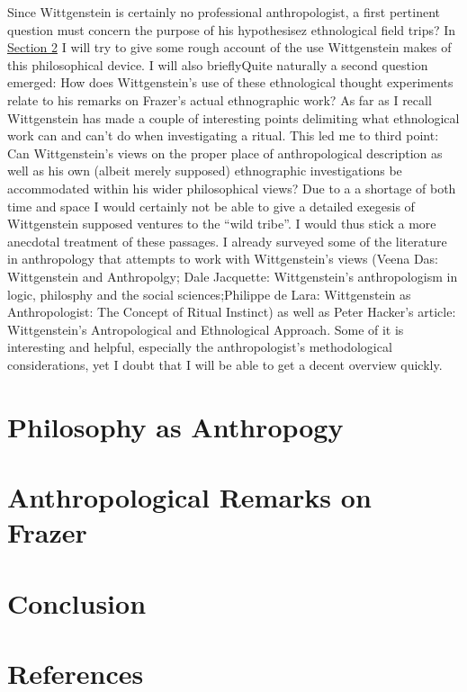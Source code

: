 \documentclass{article}
\begin{document}
Since Wittgenstein is certainly no professional anthropologist, a first pertinent question must concern the purpose of his hypothesisez ethnological field trips? In \hyperlink{sec2}{Section 2} I will try to give some rough account of the use Wittgenstein makes of this philosophical device. I will also brieflyQuite naturally a second question emerged: How does Wittgenstein’s use of these ethnological thought experiments relate to his remarks on Frazer’s actual ethnographic work? As far as I recall Wittgenstein has made a couple of interesting points delimiting what ethnological work can and can’t do when investigating a ritual.  This led me to third point: Can Wittgenstein’s views on the proper place of anthropological description as well as his own (albeit merely supposed) ethnographic investigations be accommodated within his wider philosophical views?
Due to a a shortage of both time and space I would certainly not be able to give a detailed exegesis of Wittgenstein supposed ventures to the “wild tribe”. I would thus stick a more anecdotal treatment of these passages.
I already surveyed some of the literature in anthropology that attempts to work with Wittgenstein’s views (Veena Das: Wittgenstein and Anthropolgy; Dale Jacquette: Wittgenstein’s anthropologism in logic, philosphy and the social sciences;Philippe de Lara: Wittgenstein as Anthropologist: The Concept of Ritual Instinct) as well as Peter Hacker’s article: Wittgenstein’s Antropological and Ethnological Approach. Some of it is interesting and helpful, especially the anthropologist’s methodological considerations, yet I doubt that I will be able to get a decent overview quickly.
\section{Philosophy as Anthropogy} 
\hypertarget{sec2}{}
\section{Anthropological Remarks on Frazer}
\section{Conclusion}
\section{References}
\end{document}
